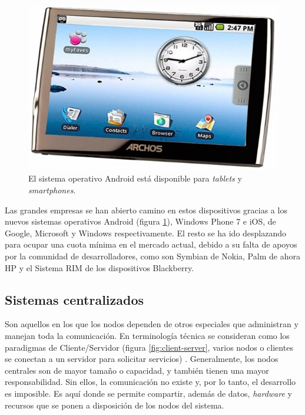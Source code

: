 \begin{figure}[h]
	\centering
	\includegraphics[scale=0.5]{images/android.png}
	\caption[Android]{El sistema operativo Android está 
	disponible para \emph{tablets} y \emph{smartphones}.}
	\label{fig:android}
\end{figure}

Las grandes empresas se han abierto camino en estos dispositivos 
gracias a los nuevos sistemas operativos Android (figura 
\ref{fig:android}), Windows Phone 7 e 
iOS, de Google, Microsoft y Windows respectivamente. El resto se ha 
ido desplazando para ocupar una cuota mínima en el mercado actual, 
debido a su falta de apoyos por la comunidad de desarrolladores, como 
son Symbian de Nokia, Palm de ahora HP y el Sistema RIM de los 
dispositivos Blackberry.

\subsection{Sistemas centralizados}
Son aquellos en los que los nodos dependen de otros especiales que 
administran y manejan toda la comunicación. En terminología técnica 
se consideran como los paradigmas de Cliente/Servidor (figura 
\ref{fig:client-server}, varios nodos o 
clientes se conectan a un servidor para solicitar servicios)
\cite{Tanenbaum}. Generalmente, los nodos centrales son de mayor 
tamaño o capacidad, y también tienen una mayor responsabilidad. Sin 
ellos, la comunicación no existe y, por lo tanto, el desarrollo es 
imposible. Es aquí donde se permite compartir, además de datos, 
\emph{hardware} y recursos que se ponen a disposición de los nodos 
del sistema.

